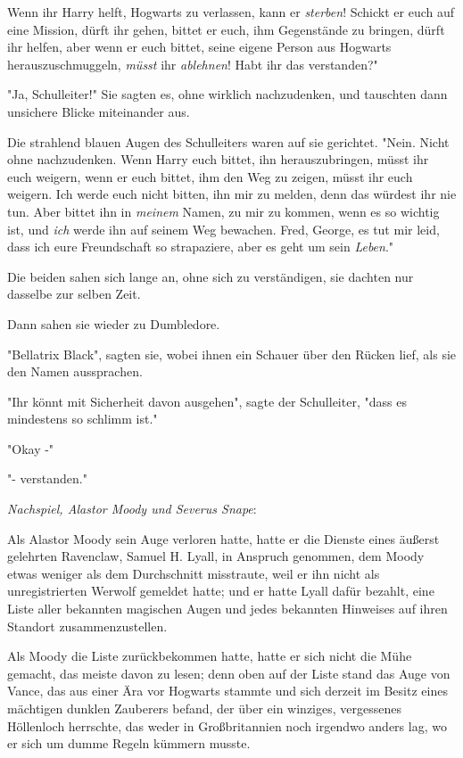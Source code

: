 {Wenn ihr Harry helft, Hogwarts zu verlassen, kann er \emph{sterben}! Schickt er euch auf eine Mission, dürft ihr gehen, bittet er euch, ihm Gegenstände zu bringen, dürft ihr helfen, aber wenn er euch bittet, seine eigene Person aus Hogwarts herauszuschmuggeln, \emph{müsst} ihr \emph{ablehnen}! Habt ihr das verstanden?"

"Ja, Schulleiter!" Sie sagten es, ohne wirklich nachzudenken, und tauschten dann unsichere Blicke miteinander aus.

Die strahlend blauen Augen des Schulleiters waren auf sie gerichtet. "Nein. Nicht ohne nachzudenken. Wenn Harry euch bittet, ihn herauszubringen, müsst ihr euch weigern, wenn er euch bittet, ihm den Weg zu zeigen, müsst ihr euch weigern. Ich werde euch nicht bitten, ihn mir zu melden, denn das würdest ihr nie tun. Aber bittet ihn in \emph{meinem} Namen, zu mir zu kommen, wenn es so wichtig ist, und \emph{ich} werde ihn auf seinem Weg bewachen. Fred, George, es tut mir leid, dass ich eure Freundschaft so strapaziere, aber es geht um sein \emph{Leben}."

Die beiden sahen sich lange an, ohne sich zu verständigen, sie dachten nur dasselbe zur selben Zeit.

Dann sahen sie wieder zu Dumbledore.

"Bellatrix Black", sagten sie, wobei ihnen ein Schauer über den Rücken lief, als sie den Namen aussprachen.

"Ihr könnt mit Sicherheit davon ausgehen", sagte der Schulleiter, "dass es mindestens so schlimm ist."

"Okay -"

"- verstanden."

\emph{Nachspiel, Alastor Moody und Severus Snape}:

Als Alastor Moody sein Auge verloren hatte, hatte er die Dienste eines äußerst gelehrten Ravenclaw, Samuel H. Lyall, in Anspruch genommen, dem Moody etwas weniger als dem Durchschnitt misstraute, weil er ihn nicht als unregistrierten Werwolf gemeldet hatte; und er hatte Lyall dafür bezahlt, eine Liste aller bekannten magischen Augen und jedes bekannten Hinweises auf ihren Standort zusammenzustellen.

Als Moody die Liste zurückbekommen hatte, hatte er sich nicht die Mühe gemacht, das meiste davon zu lesen; denn oben auf der Liste stand das Auge von Vance, das aus einer Ära vor Hogwarts stammte und sich derzeit im Besitz eines mächtigen dunklen Zauberers befand, der über ein winziges, vergessenes Höllenloch herrschte, das weder in Großbritannien noch irgendwo anders lag, wo er sich um dumme Regeln kümmern musste.

}
